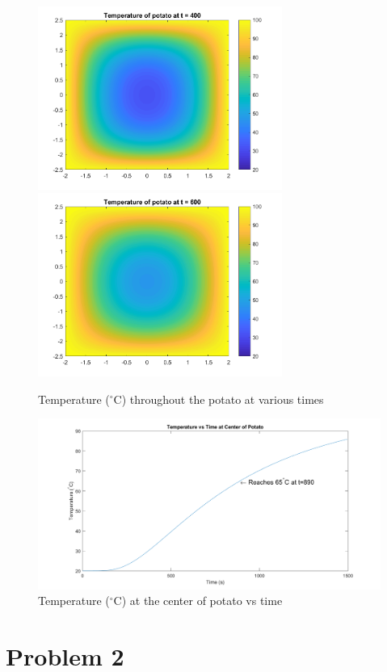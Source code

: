 \documentclass[12pt]{article}
\begin{document}
\begin{figure}[htb]%
    \centering
    {\includegraphics[width=8cm]{Problem1_fig3.png}}%
    \qquad
    {\includegraphics[width=8cm]{Problem1_fig4.png}}%
    \label{fig:p1_fig3-4}%
    \caption*{Temperature ($^{\circ}$C) throughout the potato at various times}
\end{figure}

\begin{figure}[htb]
\centering
\includegraphics[width=1\textwidth]{Problem1_fig5.png}
\caption*{Temperature ($^{\circ}$C) at the center of potato vs time}
\label{fig::p1_fig5}
\end{figure}

\section*{Problem 2}\label{sec::Problem2}
\end{document}
